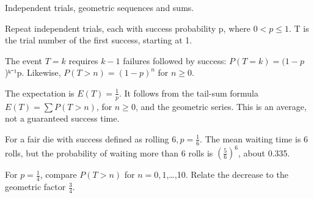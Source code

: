 \documentclass[11pt]{article}
\begin{document}
Independent trials, geometric sequences and sums.\par
{}
Repeat independent trials, each with success probability p, where \(0 < p \leq  1\). T is the trial number of the first success, starting at 1.\par
The event \(T = k\) requires \(k-1\) failures followed by success: \(P(T=k) = (1-p\))ᵏ⁻¹p. Likewise, \(P(T>n) = (1-p)^{n}\) for \(n \geq  0\).\par
The expectation is \(E(T)=\frac{1}{p}\). It follows from the tail-sum formula \(E(T)=\sum  P(T>n)\), for \(n \geq  0\), and the geometric series. This is an average, not a guaranteed success time.\par
{}
For a fair die with success defined as rolling \(6, p=\frac{1}{6}\). The mean waiting time is 6 rolls, but the probability of waiting more than 6 rolls is \((\frac{5}{6})^{6}\), about 0.335.\par
{}
For \(p=\frac{1}{4}\), compare \(P(T>n)\) for \(n=0,1\),…,10. Relate the decrease to the geometric factor \(\frac{3}{4}\).\par
\end{document}

